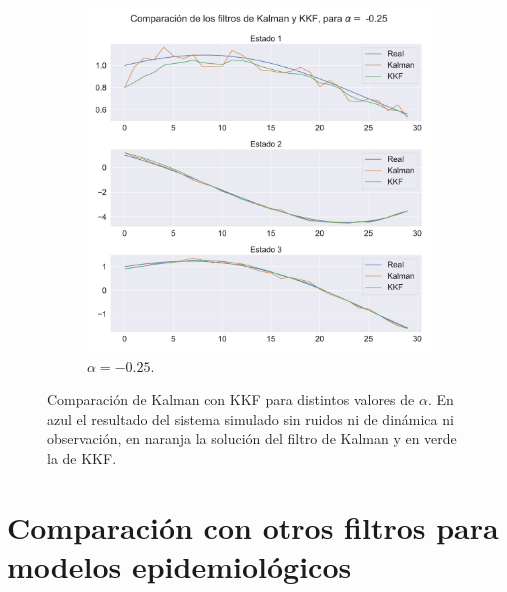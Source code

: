 \begin{figure}[h!]
\begin{subfigure}[b]{0.49\textwidth}
        \centering \includegraphics[width=0.75\linewidth]{img/content/chapter4/kalman_kkkf_025.pdf}
    \caption{$\alpha = -0.25$.}
    \label{fig:kalman_vs_KKF_025}
    \end{subfigure}
    \caption{Comparación de Kalman con KKF para distintos valores de $\alpha$. En azul el resultado del sistema simulado sin ruidos ni de dinámica ni observación, en naranja la solución del filtro de Kalman y en verde la de KKF.}
\end{figure}

\section{Comparación con otros filtros para modelos epidemiológicos}

